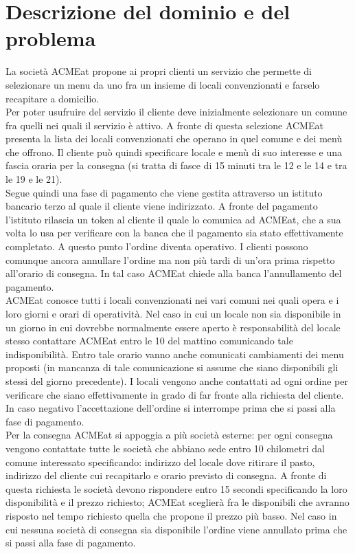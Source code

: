 \documentclass[11pt]{article} %
\begin{document}
\section{Descrizione del dominio e del problema}
\label{sez:ddp}
La società ACMEat propone ai propri clienti un servizio che permette di selezionare un menu da uno fra un insieme di locali convenzionati e farselo recapitare a domicilio.\\
Per poter usufruire del servizio il cliente deve inizialmente selezionare un comune fra quelli nei quali il servizio è attivo. A fronte di questa selezione ACMEat presenta la lista dei locali convenzionati che operano in quel comune e dei menù che offrono. Il cliente può quindi specificare locale e menù di suo interesse e una fascia oraria per la consegna (si tratta di fasce di 15 minuti tra le 12 e le 14 e tra le 19 e le 21).\\
Segue quindi una fase di pagamento che viene gestita attraverso un istituto bancario terzo al quale il cliente viene indirizzato. A fronte del pagamento l’istituto rilascia un token al cliente il quale lo comunica ad ACMEat, che a sua volta lo usa per verificare con la banca che il pagamento sia stato effettivamente completato. A questo punto l’ordine diventa operativo. I clienti possono comunque ancora annullare l’ordine ma non più tardi di un’ora prima rispetto all’orario di consegna. In tal caso ACMEat chiede alla banca l’annullamento del pagamento.\\
ACMEat conosce tutti i locali convenzionati nei vari comuni nei quali opera e i loro giorni e orari di operatività. Nel caso in cui un locale non sia disponibile in un giorno in cui dovrebbe normalmente essere aperto è responsabilità del locale stesso contattare ACMEat entro le 10 del mattino comunicando tale indisponibilità. Entro tale orario vanno anche comunicati cambiamenti dei menu proposti (in mancanza di tale comunicazione si assume che siano disponibili gli stessi del giorno precedente). I locali vengono anche contattati ad ogni ordine per verificare che siano effettivamente in grado di far fronte alla richiesta del cliente. In caso negativo l’accettazione dell’ordine si interrompe prima che si passi alla fase di pagamento.\\
Per la consegna ACMEat si appoggia a più società esterne: per ogni consegna vengono contattate tutte le società che abbiano sede entro 10 chilometri dal comune interessato specificando: indirizzo del locale dove ritirare il pasto, indirizzo del cliente cui recapitarlo e orario previsto di consegna. A fronte di questa richiesta le società devono rispondere entro 15 secondi specificando la loro disponibilità e il prezzo richiesto; ACMEat sceglierà fra le disponibili che avranno risposto nel tempo richiesto quella che propone il prezzo più basso. Nel caso in cui nessuna società di consegna sia disponibile l’ordine viene annullato prima che si passi alla fase di pagamento.
\end{document}
